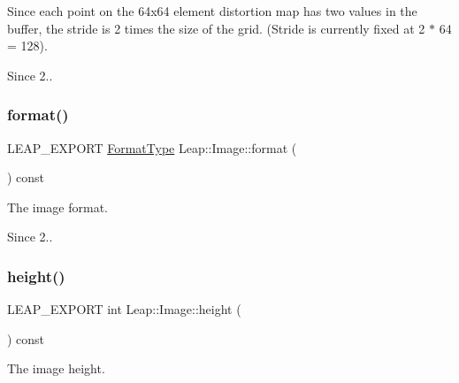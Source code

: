 Since each point on the 64x64 element distortion map has two values in the buffer, the stride is 2 times the size of the grid. (Stride is currently fixed at 2 $\ast$ 64 = 128).


\begin{DoxyCodeInclude}
\end{DoxyCodeInclude}


\begin{DoxySince}{Since}
2.. 
\end{DoxySince}
\mbox{\label{class_leap_1_1_image_a50d3952ed622312536c9f935987156c1}} 
\subsubsection{\texorpdfstring{format()}{format()}}
{\footnotesize\ttfamily L\+E\+A\+P\+\_\+\+E\+X\+P\+O\+RT \hyperlink{class_leap_1_1_image_acefbe5d3803afc9f433a6e3856d242d1}{Format\+Type} Leap\+::\+Image\+::format (\begin{DoxyParamCaption}{ }\end{DoxyParamCaption}) const}

The image format.


\begin{DoxyCodeInclude}
\end{DoxyCodeInclude}


\begin{DoxySince}{Since}
2.. 
\end{DoxySince}
\mbox{\label{class_leap_1_1_image_aa0715444f45580442c65f707eacc77a9}} 
\subsubsection{\texorpdfstring{height()}{height()}}
{\footnotesize\ttfamily L\+E\+A\+P\+\_\+\+E\+X\+P\+O\+RT int Leap\+::\+Image\+::height (\begin{DoxyParamCaption}{ }\end{DoxyParamCaption}) const}

The image height.


\begin{DoxyCodeInclude}
\end{DoxyCodeInclude}



